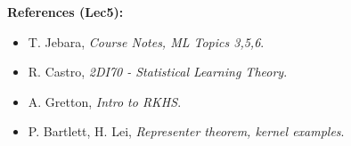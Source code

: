 \documentclass[10pt]{article}
\begin{document}
\begin{multicols}{2}
\vfill
\textbf{References (Lec5):}
\begin{itemize}\setlength{\itemsep}{0pt}
\item T. Jebara, \emph{Course Notes, ML Topics 3,5,6}.
\item R. Castro, \emph{2DI70 - Statistical Learning Theory}.
\item A. Gretton, \emph{Intro to RKHS}.
\item P. Bartlett, H. Lei, \emph{Representer theorem, kernel examples}.
\end{itemize}

\end{multicols}
\end{document}
